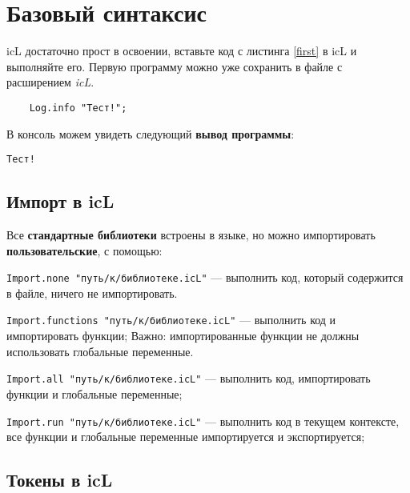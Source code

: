 

\section{Базовый синтаксис}

icL достаточно прост в освоении, вставьте код с листинга \ref{first} в icL и выполняйте его. Первую программу можно уже сохранить в файле с расширением \textit{icL}.

\begin{sourcecode}
	\label{first}
	\begin{verbatim}
	Log.info "Тест!";
	\end{verbatim}
\end{sourcecode}

В консоль можем увидеть следующий \textbf{вывод программы}:

\begin{verbatim}
Тест!
\end{verbatim}

\subsection{Импорт в icL}

Все \textbf{стандартные библиотеки} встроены в языке, но можно импортировать \textbf{пользовательские}, с помощью:

\begin{icItems}
\item
	\texttt{Import.none "путь/к/библиотеке.icL"} — выполнить код, который содержится в файле, ничего не импортировать.
\item
	\texttt{Import.functions "путь/к/библиотеке.icL"} — выполнить код и импортировать функции; {\color{red}Важно:} импортированные функции не должны использовать глобальные переменные.
\item
	\texttt{Import.all "путь/к/библиотеке.icL"} —  выполнить код, импортировать функции и глобальные переменные;
\item
	\texttt{Import.run "путь/к/библиотеке.icL"} — выполнить код в текущем контексте, все функции и глобальные переменные импортируется и экспортируется;
\end{icItems}

\subsection{Токены в icL}

